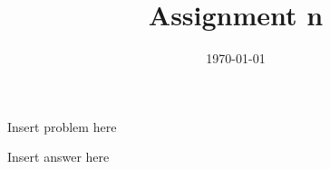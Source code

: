\documentclass[12pt,a4paper]{article}
\title{Assignment n}
\date{\today}
\begin{document}
    \begin{problem}
        Insert problem here
    \end{problem}
    
    \begin{answer}
        Insert answer here
    \end{answer}
\end{document}

